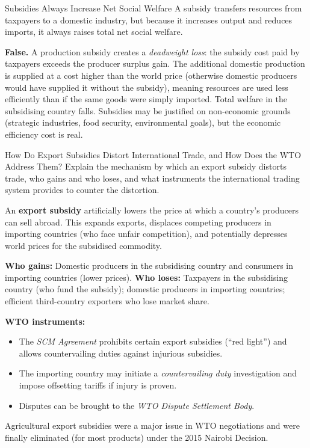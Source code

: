 \documentclass[paper=a5]{scrartcl}
\begin{document}
\begin{question}[type=tf]{Subsidies Always Increase Net Social Welfare}
A subsidy transfers resources from taxpayers to a domestic industry, but
because it increases output and reduces imports, it always raises total
net social welfare.
\truefalse[false]
\begin{solution}
  \textbf{False.} A production subsidy creates a \emph{deadweight loss}: the
  subsidy cost paid by taxpayers exceeds the producer surplus gain. The
  additional domestic production is supplied at a cost higher than the world
  price (otherwise domestic producers would have supplied it without the
  subsidy), meaning resources are used less efficiently than if the same
  goods were simply imported. Total welfare in the subsidising country falls.
  Subsidies may be justified on non-economic grounds (strategic industries,
  food security, environmental goals), but the economic efficiency cost is real.
\end{solution}
\end{question}

\begin{question}[type=open]{How Do Export Subsidies Distort International Trade,
  and How Does the WTO Address Them?}
Explain the mechanism by which an export subsidy distorts trade, who gains
and who loses, and what instruments the international trading system provides
to counter the distortion.

\answerlines[7]

\begin{solution}
  An \textbf{export subsidy} artificially lowers the price at which a
  country's producers can sell abroad. This expands exports, displaces
  competing producers in importing countries (who face unfair competition),
  and potentially depresses world prices for the subsidised commodity.

  \textbf{Who gains:} Domestic producers in the subsidising country and
  consumers in importing countries (lower prices). \textbf{Who loses:}
  Taxpayers in the subsidising country (who fund the subsidy); domestic
  producers in importing countries; efficient third-country exporters who
  lose market share.

  \textbf{WTO instruments:}
  \begin{itemize}
    \item The \emph{SCM Agreement} prohibits certain export subsidies (``red
      light'') and allows countervailing duties against injurious subsidies.
    \item The importing country may initiate a \emph{countervailing duty}
      investigation and impose offsetting tariffs if injury is proven.
    \item Disputes can be brought to the \emph{WTO Dispute Settlement Body}.
  \end{itemize}
  Agricultural export subsidies were a major issue in WTO negotiations and
  were finally eliminated (for most products) under the 2015 Nairobi
  Decision.
\end{solution}
\end{question}
\end{document}
